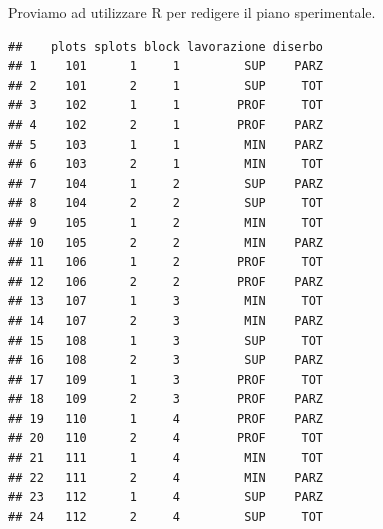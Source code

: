 \documentclass[a4paper,12pt,oneside]{book}
\newenvironment{Shaded}{\begin{snugshade}}{\end{snugshade}}
\newcommand{\KeywordTok}[1]{\textcolor[rgb]{0.13,0.29,0.53}{\textbf{#1}}}
\newcommand{\DataTypeTok}[1]{\textcolor[rgb]{0.13,0.29,0.53}{#1}}
\newcommand{\DecValTok}[1]{\textcolor[rgb]{0.00,0.00,0.81}{#1}}
\newcommand{\StringTok}[1]{\textcolor[rgb]{0.31,0.60,0.02}{#1}}
\newcommand{\OperatorTok}[1]{\textcolor[rgb]{0.81,0.36,0.00}{\textbf{#1}}}
\newcommand{\NormalTok}[1]{#1}
\begin{document}
Proviamo ad utilizzare R per redigere il piano sperimentale.

\begin{Shaded}
\end{Shaded}

\begin{verbatim}
##    plots splots block lavorazione diserbo
## 1    101      1     1         SUP    PARZ
## 2    101      2     1         SUP     TOT
## 3    102      1     1        PROF     TOT
## 4    102      2     1        PROF    PARZ
## 5    103      1     1         MIN    PARZ
## 6    103      2     1         MIN     TOT
## 7    104      1     2         SUP    PARZ
## 8    104      2     2         SUP     TOT
## 9    105      1     2         MIN     TOT
## 10   105      2     2         MIN    PARZ
## 11   106      1     2        PROF     TOT
## 12   106      2     2        PROF    PARZ
## 13   107      1     3         MIN     TOT
## 14   107      2     3         MIN    PARZ
## 15   108      1     3         SUP     TOT
## 16   108      2     3         SUP    PARZ
## 17   109      1     3        PROF     TOT
## 18   109      2     3        PROF    PARZ
## 19   110      1     4        PROF    PARZ
## 20   110      2     4        PROF     TOT
## 21   111      1     4         MIN     TOT
## 22   111      2     4         MIN    PARZ
## 23   112      1     4         SUP    PARZ
## 24   112      2     4         SUP     TOT
\end{verbatim}
\end{document}
